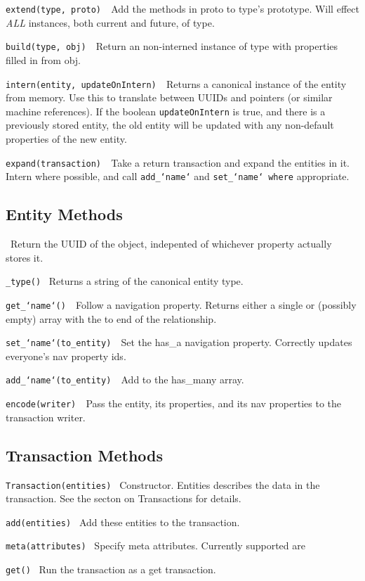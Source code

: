 \documentclass{article}
\begin{document}
	{\tt extend(type, proto) }\
		Add the methods in proto to type's prototype. Will effect {\it ALL}
		instances, both current and future, of type.

	{\tt build(type, obj) }\
		Return an non-interned instance of type with properties filled in from
		obj.

	{\tt intern(entity, updateOnIntern) }\
		Returns a canonical instance of the entity from memory. Use this to
		translate between UUIDs and pointers (or similar machine references). If
		the boolean {\tt updateOnIntern} is true, and there is a previously
		stored entity, the old entity will be updated with any non-default
		properties of the new entity.

	{\tt expand(transaction) }\
		Take a return transaction and expand the entities in it. Intern where
		possible, and call {\tt add\_`name`} and {\tt set\_`name` where}
		appropriate.

\subsection{Entity Methods}
\indent {\tt id()} \
		Return the UUID of the object, indepented of whichever property actually
		stores it.

	{\tt \_type()} \
		Returns a string of the canonical entity type.

	{\tt get\_`name`() }\
		Follow a navigation property. Returns either a single or (possibly
		empty) array with the to end of the relationship.

	{\tt set\_`name`(to\_entity) }\
		Set the has\_a navigation property. Correctly updates everyone's nav
		property ids.

	{\tt add\_`name`(to\_entity) }\
		Add to the has\_many array.

	{\tt encode(writer) }\
		Pass the entity, its properties, and its nav properties to the
		transaction writer.

\subsection{Transaction Methods}
	{\tt Transaction(entities) }
		Constructor. Entities describes the data in the transaction. See the
		secton on Transactions for details.

	{\tt add(entities) }
		Add these entities to the transaction.

	{\tt meta(attributes) }
		Specify meta attributes. Currently supported are

	{\tt get() }
		Run the transaction as a get transaction.
\end{document}
